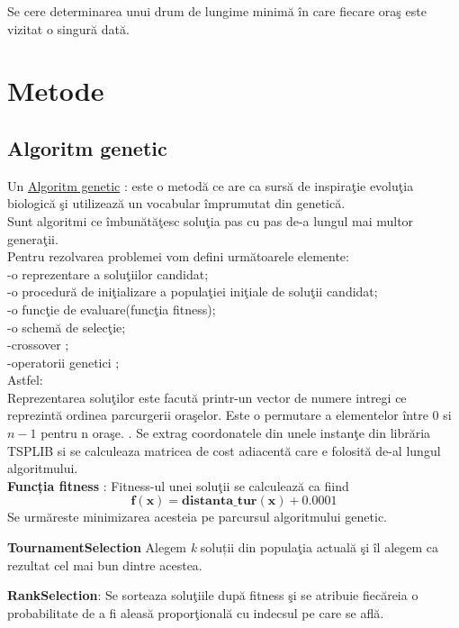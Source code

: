 \documentclass[11pt,leqno]{article}
\begin{document}
Se cere determinarea unui drum   de lungime  minim\u a \^ in care fiecare ora\c s este vizitat o singur\u a dat\u a. 

 
\section{Metode}

\subsection{Algoritm genetic}

Un \uline{Algoritm genetic} : este o metodă ce are ca surs\u a de inspira\c tie evolu\c tia biologic\u a \c si utilizeaz\u a un vocabular \^ imprumutat din genetic\u a.\\
Sunt algoritmi ce \^ imbun\u at\u a\c tesc solu\c tia pas cu pas de-a lungul mai multor genera\c tii.\\
Pentru rezolvarea problemei vom defini urm\u atoarele  elemente:\\
-o reprezentare a solu\c tiilor candidat;\\
-o procedur\u a de ini\c tializare a popula\c tiei ini\c tiale  de solu\c tii candidat;\\
-o func\c tie de evaluare(func\c tia fitness); \\
-o schem\u a de selec\c tie;\\
-crossover ;\\
-operatorii genetici ;\\
Astfel:\\
Reprezentarea solu\c tilor este facut\u a printr-un vector de numere intregi ce reprezint\u a ordinea parcurgerii ora\c selor. Este o permutare a elementelor \^ intre 0 si $n-1$ pentru n ora\c se.
. Se extrag coordonatele din unele instan\c te din libr\u aria TSPLIB \cite{TSPLIB} si se calculeaza matricea de cost adiacent\u a care e folosit\u a de-al lungul algoritmului.
 \\
 \textbf{Funcția fitness} : Fitness-ul unei solu\c tii se calculeaz\u a ca fiind 
$$ \mathbf{ f(x) = distanta\_tur(x) + 0.0001}$$
Se urm\u areste minimizarea acesteia pe parcursul algoritmului genetic.
\\
\par \textbf{TournamentSelection} 
Alegem \textit{k} soluții  din popula\c tia actual\u a \c si \^ il alegem ca rezultat cel mai bun dintre acestea.

\par \textbf{RankSelection}: Se sorteaza solu\c tiile dup\u a fitness \c si se atribuie fiec\u areia o probabilitate de a fi aleas\u a propor\c tional\u a cu indecsul pe care se afl\u a.
\end{document}
